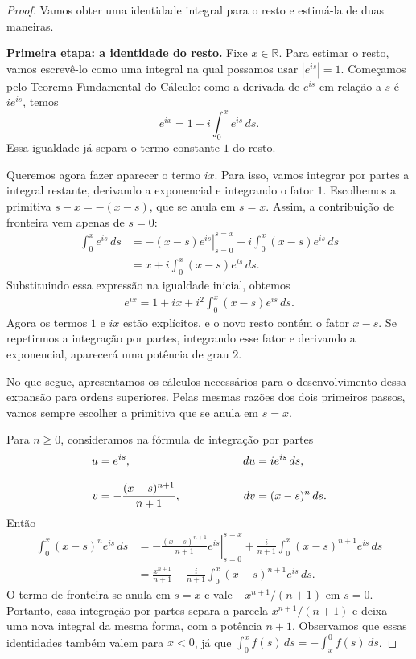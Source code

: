 \documentclass[12pt,portuguese]{article}
\theoremstyle{definition}
\theoremstyle{plainexercise}
\theoremstyle{starredexercise}
\theoremstyle{definition}
\begin{document}
\begin{proof}
Vamos obter uma identidade integral para o resto e estimá-la de duas
maneiras.

\smallskip
\noindent\textbf{Primeira etapa: a identidade do resto.}
Fixe $x\in\mathbb{R}$. Para estimar o resto, vamos escrevê-lo como uma
integral na qual possamos usar $|e^{is}|=1$. Começamos pelo Teorema
Fundamental do Cálculo: como a derivada de $e^{is}$ em relação a $s$
é $ie^{is}$, temos
\[
e^{ix}=1+i\int_0^x e^{is}\,ds.
\]
Essa igualdade já separa o termo constante $1$ do resto.

Queremos agora fazer aparecer o termo $ix$. Para isso, vamos integrar
por partes a integral restante, derivando a exponencial e integrando
o fator $1$. Escolhemos a primitiva $s-x=-(x-s)$, que se anula em
$s=x$. Assim, a contribuição de fronteira vem apenas de $s=0$:
\begin{align*}
\int_0^x e^{is}\,ds
&=\left.-(x-s)e^{is}\right|_{s=0}^{s=x}
+i\int_0^x(x-s)e^{is}\,ds
\\[0.3cm]
&=x+i\int_0^x(x-s)e^{is}\,ds.
\end{align*}
Substituindo essa expressão na igualdade inicial, obtemos
\begin{align}\label{aprox1-intpartes}
e^{ix}=1+ix+i^2\int_0^x(x-s)e^{is}\,ds.
\end{align}
Agora os termos $1$ e $ix$ estão explícitos, e o novo resto contém
o fator $x-s$. Se repetirmos a integração por partes, integrando esse
fator e derivando a exponencial, aparecerá uma potência de grau $2$.

No que segue, apresentamos os cálculos necessários
para o desenvolvimento dessa expansão para ordens superiores.
Pelas mesmas razões dos dois primeiros passos,
vamos sempre escolher a primitiva que se anula em $s=x$.

Para $n\geqslant0$, consideramos na fórmula de integração por partes
\[
\begin{alignedat}{2}
u &= e^{is},
&\hspace{2.0cm} du &= ie^{is}\,ds,
\\[0.3cm]
v &= -\frac{(x-s)^{n+1}}{n+1},
& dv &= (x-s)^n\,ds.
\end{alignedat}
\]
Então 
\begin{align}\label{eq:man-identidade-partes}
\int_0^x(x-s)^n e^{is}\,ds
&=\left.-\frac{(x-s)^{n+1}}{n+1}e^{is}\right|_{s=0}^{s=x}
+\frac{i}{n+1}\int_0^x(x-s)^{n+1}e^{is}\,ds
\nonumber\\[0.3cm]
&=\frac{x^{n+1}}{n+1}
+\frac{i}{n+1}\int_0^x(x-s)^{n+1}e^{is}\,ds.
\end{align}
O termo de fronteira se anula em $s=x$ e vale
$-x^{n+1}/(n+1)$ em $s=0$. Portanto, essa integração por partes
separa a parcela $x^{n+1}/(n+1)$ e deixa uma nova integral da mesma
forma, com a potência $n+1$. Observamos que essas identidades também valem para
$x<0$, já que
$\int_0^x f(s)\,ds=-\int_x^0 f(s)\,ds$.


\end{proof}
\end{document}

